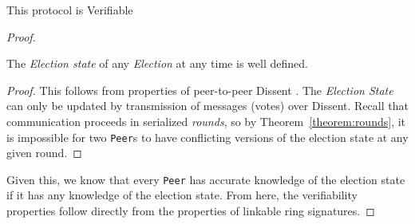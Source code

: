 \begin{theorem} This protocol is Verifiable\end{theorem}

\begin{proof}

  \begin{lemma}The \emph{Election state} of any \emph{Election} at
  any time is well defined. \end{lemma}
  \begin{proof}This follows from properties of peer-to-peer Dissent \cite{sec}.
    The \emph{Election State} can only be updated by transmission of messages
    (votes) over Dissent. Recall that communication proceeds in serialized
    \emph{rounds}, so by Theorem~\ref{theorem:rounds}, it is impossible for two
    \texttt{Peer}s to have conflicting versions of the election state at any
    given round.
  \end{proof}

  Given this, we know that every \texttt{Peer} has accurate knowledge of the
  election state if it has any knowledge of the election state. From here, the
  verifiability properties follow directly from the properties of linkable ring
  signatures.


\end{proof}


